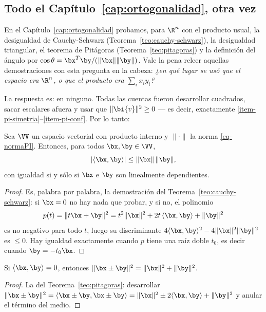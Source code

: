 \subsection{\texorpdfstring{Todo el Capítulo~\ref{cap:ortogonalidad}, otra vez}{Todo el capitulo de ortogonalidad, otra vez}}

En el Capítulo~\ref{cap:ortogonalidad} probamos, para $\R^n$ con el producto
usual, la desigualdad de Cauchy-Schwarz (Teorema~\ref{teo:cauchy-schwarz}),
la desigualdad triangular, el teorema de Pitágoras
(Teorema~\ref{teo:pitagoras}) y la definición del ángulo por
$\cos\theta=\bx^T\by/(\|\bx\|\|\by\|)$. Vale la pena releer aquellas
demostraciones con esta pregunta en la cabeza: \emph{¿en qué lugar se usó que
el espacio era $\R^n$, o que el producto era $\sum_ix_iy_i$?}

La respuesta es: en ninguno. Todas las cuentas fueron desarrollar cuadrados,
sacar escalares afuera y usar que $\|\bi{v}\|^2\ge0$ --- es decir,
exactamente \ref{item-pi-simetria}--\ref{item-pi-conf}. Por lo tanto:

\begin{theorem}\label{teo-cs}
Sea $\VV$ un espacio vectorial con producto interno y $\|\cdot\|$ la norma
\eqref{eq-normaPI}. Entonces, para todos $\bx,\by\in\VV$,
\[
|\langle\bx,\by\rangle|\le\|\bx\|\,\|\by\| ,
\]
con igualdad si y sólo si $\bx$ e $\by$ son linealmente dependientes.
\end{theorem}

\begin{proof}
Es, palabra por palabra, la demostración del
Teorema~\ref{teo:cauchy-schwarz}: si $\bx=0$ no hay nada que probar, y si no,
el polinomio
\[
p(t)=\|t\bx+\by\|^2=t^2\|\bx\|^2+2t\,\langle\bx,\by\rangle+\|\by\|^2
\]
es no negativo para todo $t$, luego su discriminante
$4\langle\bx,\by\rangle^2-4\|\bx\|^2\|\by\|^2$ es $\le0$. Hay igualdad
exactamente cuando $p$ tiene una raíz doble $t_0$, es decir cuando
$\by=-t_0\bx$.
\end{proof}

\begin{theorem}[Pitágoras]\label{teo-pitagoras-gral}
Si $\langle\bx,\by\rangle=0$, entonces
$\|\bx\pm\by\|^2=\|\bx\|^2+\|\by\|^2$.
\end{theorem}

\begin{proof}
La del Teorema~\ref{teo:pitagoras}: desarrollar
$\|\bx\pm\by\|^2=\langle\bx\pm\by,\bx\pm\by\rangle
=\|\bx\|^2\pm2\langle\bx,\by\rangle+\|\by\|^2$ y anular el término del medio.
\end{proof}

